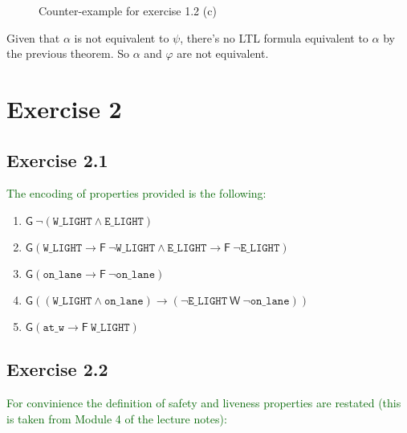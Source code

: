 \documentclass[12pt]{article}
\newcommand{\drafter}[1]{\textcolor{darkgreen}{#1}}
\begin{document}
\begin{enumerate}[label=\roman*.]
\begin{enumerate}[label=(\alph*)]
\begin{figure}[ht]
      \caption{Counter-example for exercise 1.2 (c)}
      \label{fig:1-2-c}
    \end{figure}

  Given that $\alpha$ is not equivalent to $\psi$, there's no LTL formula equivalent to $\alpha$ by the previous theorem.
  So $\alpha$ and $\varphi$ are not equivalent.

\end{enumerate}

\section*{Exercise 2}

\subsection*{Exercise 2.1}

\drafter{The encoding of properties provided is the following:}

\begin{enumerate}[label=(\alph*)]
  \item $\mathsf{G}~\neg(\texttt{W\_LIGHT} \wedge \texttt{E\_LIGHT})$

  \item $\mathsf{G}(\texttt{W\_LIGHT} \rightarrow \mathsf{F}~\neg\texttt{W\_LIGHT} \wedge \texttt{E\_LIGHT} \rightarrow \mathsf{F}~\neg\texttt{E\_LIGHT})$

  \item $\mathsf{G}(\texttt{on\_lane} \rightarrow \mathsf{F}~\neg\texttt{on\_lane})$

  \item $\mathsf{G}((\texttt{W\_LIGHT} \wedge \texttt{on\_lane}) \rightarrow (\neg\texttt{E\_LIGHT}~\mathsf{W}~\neg\texttt{on\_lane}))$

  \item $\mathsf{G}(\texttt{at\_w} \rightarrow \mathsf{F}~\texttt{W\_LIGHT})$
\end{enumerate}

\subsection*{Exercise 2.2}

\drafter{For convinience the definition of safety and liveness properties are restated (this is taken from Module 4 of the lecture notes):}


\end{enumerate}
\end{document}
